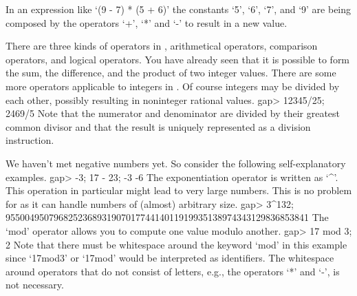 \null

%
In an  expression like `(9  - 7) * (5 +  6)' the constants `5', `6', `7',
and `9' are being composed by the operators `+', `*' and `-' to result in
a new value.

There are  three kinds  of operators in  {\GAP}, arithmetical  operators,
comparison operators, and logical operators.  You  have already seen that
it is possible to form  the sum,  the  difference, and the product of two
integer values.  There are some  more operators applicable to integers in
{\GAP}.   Of  course integers  may  be divided  by  each other,  possibly
resulting in noninteger rational values.
\beginexample
gap> 12345/25;
2469/5 
\endexample
Note  that  the numerator and denominator  are divided by their  greatest
common divisor  and that the result is uniquely represented as a division
instruction.

We     haven't met negative numbers      yet.  So consider the  following
self-explanatory examples.
\beginexample
gap> -3; 17 - 23;
-3
-6 
\endexample
The exponentiation   operator  is  written  as  `^'. This   operation  in
particular might lead  to  very large numbers.  This  is  no problem  for
{\GAP} as it can handle numbers of (almost) arbitrary size.
\beginexample
gap> 3^132;
955004950796825236893190701774414011919935138974343129836853841 
\endexample
The `mod' operator allows you to compute one value modulo another.
\beginexample
gap> 17 mod 3;
2 
\endexample
Note  that  there must be   whitespace around the  keyword  `mod' in this
example since `17mod3' or `17mod' would be interpreted as identifiers.
The whitespace around operators that do not consist of letters, e.g.,
the operators `*' and `-', is not necessary.

